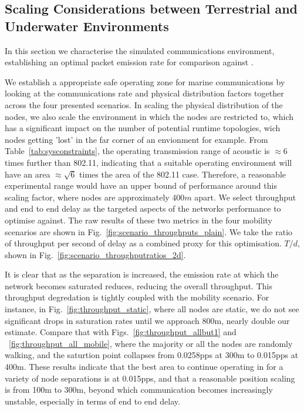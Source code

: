 \documentclass[runningheads,a4paper]{llncs}
\begin{document}
\subsection{Scaling Considerations between Terrestrial and Underwater Environments}

In this section we characterise the simulated communications environment, establishing an optimal packet emission rate for comparison against \cite{Guo11}.

We establish a appropriate safe operating zone for marine communications by looking at the communications rate and physical distribution factors together across the four presented scenarios.
In scaling the physical distribution of the nodes, we also scale the environment in which the nodes are restricted to, which has a significant impact on the number of potential runtime topologies, wich nodes getting 'lost' in the far corner of an envionment for example. 
From Table~\ref{tab:sysconstraints}, the operating transmission range of acoustic is $\approx 6$ times further than 802.11, indicating that a suitable operating environment will have an area $\approx \sqrt{6}$ times the area of the 802.11 case.
Therefore, a reasonable experimental range would have an upper bound of performance around this scaling factor, where nodes are approximately 400$m$ apart. 
We select throughput and end to end delay as the targeted aspects of the networks performance to optimise against.
The raw results of these two metrics in the four mobility scenarios are shown in Fig.~\ref{fig:scenario_throughputs_plain}.
We take the ratio of throughput per second of delay as a combined proxy for this optimisation. $T/d$, shown in Fig.~\ref{fig:scenario_throughputratios_2d}.

It is clear that as the separation is increased, the emission rate at which the network becomes saturated reduces, reducing the overall throughput. 
This throughput degredation is tightly coupled with the mobility scenario.
For instance, in Fig.~\ref{fig:throughput_static}, where all nodes are static, we do not see significant drops in saturation rates until we approach 800m, nearly double our estimate. 
Compare that with Figs.~\ref{fig:throughput_allbut1} and ~\ref{fig:throughput_all_mobile}, where the majority or all the nodes are randomly walking, and the saturtion point collapses from 0.0258pps at 300m to 0.015pps at 400m.
These results indicate that the best area to continue operating in for a variety of node separations is at 0.015pps, and that a reasonable position scaling is from 100m to 300m, beyond which communication becomes increasingly unstable, especially in terms of end to end delay.
\end{document}
